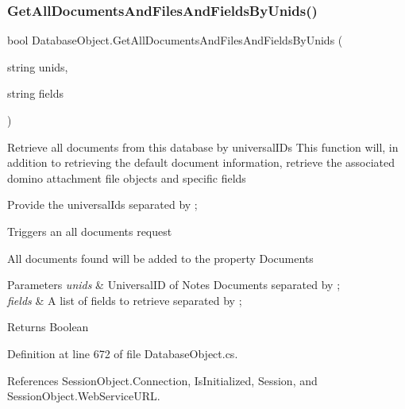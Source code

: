 \subsubsection{\texorpdfstring{Get\+All\+Documents\+And\+Files\+And\+Fields\+By\+Unids()}{GetAllDocumentsAndFilesAndFieldsByUnids()}\hspace{0.1cm}{\footnotesize\ttfamily [2/4]}}
{\footnotesize\ttfamily bool Database\+Object.\+Get\+All\+Documents\+And\+Files\+And\+Fields\+By\+Unids (\begin{DoxyParamCaption}\item[{string}]{unids,  }\item[{string}]{fields }\end{DoxyParamCaption})}



Retrieve all documents from this database by universal\+I\+Ds This function will, in addition to retrieving the default document information, retrieve the associated domino attachment file objects and specific fields 

Provide the universal\+Ids separated by ;

Triggers an all documents request

All documents found will be added to the property \textquotesingle{}Documents\textquotesingle{}


\begin{DoxyParams}{Parameters}
{\em unids} & Universal\+ID of Notes Documents separated by ; \\
\hline
{\em fields} & A list of fields to retrieve separated by ; \\
\hline
\end{DoxyParams}
\begin{DoxyReturn}{Returns}
Boolean
\end{DoxyReturn}


Definition at line 672 of file Database\+Object.\+cs.



References Session\+Object.\+Connection, Is\+Initialized, Session, and Session\+Object.\+Web\+Service\+U\+RL.


